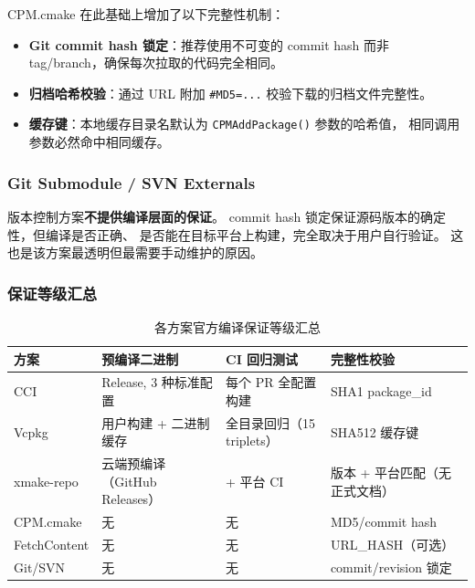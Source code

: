 \documentclass[12pt,a4paper,fontset=fandol]{ctexbook}
\begin{document}
CPM.cmake 在此基础上增加了以下完整性机制：

\begin{itemize}[nosep]
  \item \textbf{Git commit hash 锁定}：推荐使用不可变的 commit hash
        而非 tag/branch，确保每次拉取的代码完全相同。
  \item \textbf{归档哈希校验}：通过 URL 附加 \texttt{\#MD5=...}
        校验下载的归档文件完整性。
  \item \textbf{缓存键}：本地缓存目录名默认为
        \texttt{CPMAddPackage()} 参数的哈希值，
        相同调用参数必然命中相同缓存。
\end{itemize}

\subsubsection*{Git Submodule / SVN Externals}

版本控制方案\textbf{不提供编译层面的保证}。
commit hash 锁定保证源码版本的确定性，但编译是否正确、
是否能在目标平台上构建，完全取决于用户自行验证。
这也是该方案最透明但最需要手动维护的原因。

\subsubsection*{保证等级汇总}

\begin{table}[H]
\centering
\caption{各方案官方编译保证等级汇总}
\label{tab:guarantee-summary}
\small
\begin{tabularx}{\textwidth}{l >{\raggedright\arraybackslash}X >{\raggedright\arraybackslash}X >{\raggedright\arraybackslash}X}
\toprule
\textbf{方案} & \textbf{预编译二进制} & \textbf{CI 回归测试} & \textbf{完整性校验} \\
\midrule
CCI       & Release, 3 种标准配置 & 每个 PR 全配置构建    & SHA1 package\_id \\
Vcpkg     & 用户构建 + 二进制缓存  & 全目录回归（15 triplets） & SHA512 缓存键 \\
xmake-repo & 云端预编译（GitHub Releases） & 10+ 平台 CI & 版本 + 平台匹配（无正式文档） \\
CPM.cmake & 无                    & 无                  & MD5/commit hash \\
FetchContent & 无                  & 无                  & URL\_HASH（可选） \\
Git/SVN   & 无                    & 无                  & commit/revision 锁定 \\
\bottomrule
\end{tabularx}
\end{table}
\end{document}
